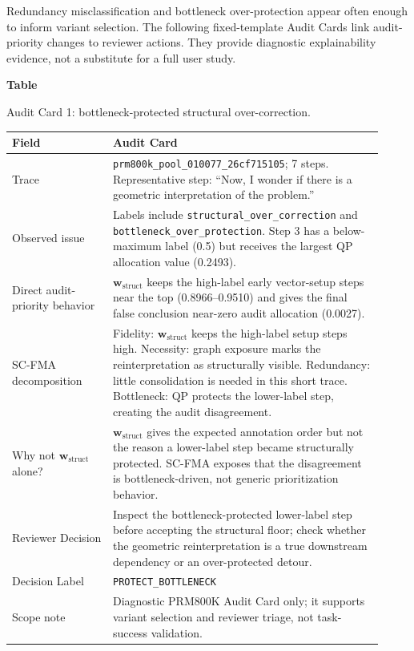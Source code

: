 \documentclass[a4paper,fleqn]{cas-sc}
\newcommand{\wstruct}{\ensuremath{\mathbf{w}_{\mathrm{struct}}}}
\begin{document}
Redundancy misclassification and bottleneck over-protection appear often enough to inform variant selection. The following fixed-template Audit Cards link audit-priority changes to reviewer actions. They provide diagnostic explainability evidence, not a substitute for a full user study.

\par\medskip
{}\label{tab:audit-card-geometric}
\noindent\textbf{Table~\thetable}\par
\noindent Audit Card 1: bottleneck-protected structural over-correction.
\begin{center}
\small
\renewcommand{\arraystretch}{1.08}
\begin{tabular}{p{0.25\linewidth}p{0.67\linewidth}}
\toprule
\textbf{Field} & \textbf{Audit Card} \\
\midrule
Trace & \texttt{prm800k\_pool\_010077\_26cf715105}; 7 steps. Representative step: ``Now, I wonder if there is a geometric interpretation of the problem.'' \\
Observed issue & Labels include \texttt{structural\_over\_correction} and \texttt{bottleneck\_over\_protection}. Step 3 has a below-maximum label (0.5) but receives the largest QP allocation value (0.2493). \\
Direct audit-priority behavior & \wstruct{} keeps the high-label early vector-setup steps near the top (0.8966--0.9510) and gives the final false conclusion near-zero audit allocation (0.0027). \\
SC-FMA decomposition & Fidelity: \wstruct{} keeps the high-label setup steps high. Necessity: graph exposure marks the reinterpretation as structurally visible. Redundancy: little consolidation is needed in this short trace. Bottleneck: QP protects the lower-label step, creating the audit disagreement. \\
Why not \wstruct{} alone? & \wstruct{} gives the expected annotation order but not the reason a lower-label step became structurally protected. SC-FMA exposes that the disagreement is bottleneck-driven, not generic prioritization behavior. \\
Reviewer Decision & Inspect the bottleneck-protected lower-label step before accepting the structural floor; check whether the geometric reinterpretation is a true downstream dependency or an over-protected detour. \\
Decision Label & \texttt{PROTECT\_BOTTLENECK} \\
Scope note & Diagnostic PRM800K Audit Card only; it supports variant selection and reviewer triage, not task-success validation. \\
\bottomrule
\end{tabular}
\end{center}
\medskip
\end{document}
